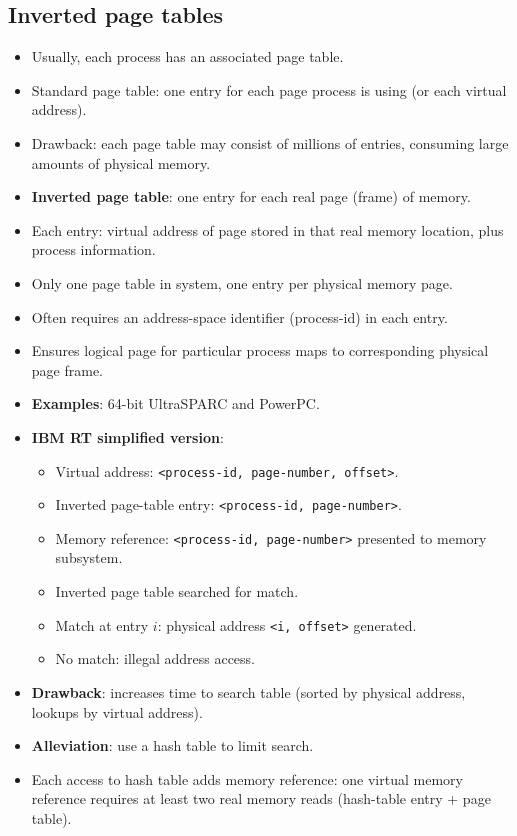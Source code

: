 \subsection{Inverted page tables}
\begin{itemize}
    \item Usually, each process has an associated page table.
    \item Standard page table: one entry for each page process is using (or each virtual address).
    \item Drawback: each page table may consist of millions of entries, consuming large amounts of physical memory.
    \item \textbf{Inverted page table}: one entry for each real page (frame) of memory.
    \item Each entry: virtual address of page stored in that real memory location, plus process information.
    \item Only one page table in system, one entry per physical memory page.
    \item Often requires an address-space identifier (process-id) in each entry.
    \item Ensures logical page for particular process maps to corresponding physical page frame.
    \item \textbf{Examples}: 64-bit UltraSPARC and PowerPC.
    \item \textbf{IBM RT simplified version}:
    \begin{itemize}
        \item Virtual address: \texttt{<process-id, page-number, offset>}.
        \item Inverted page-table entry: \texttt{<process-id, page-number>}.
        \item Memory reference: \texttt{<process-id, page-number>} presented to memory subsystem.
        \item Inverted page table searched for match.
        \item Match at entry $i$: physical address \texttt{<i, offset>} generated.
        \item No match: illegal address access.
    \end{itemize}
    \item \textbf{Drawback}: increases time to search table (sorted by physical address, lookups by virtual address).
    \item \textbf{Alleviation}: use a hash table to limit search.
    \item Each access to hash table adds memory reference: one virtual memory reference requires at least two real memory reads (hash-table entry + page table).

\end{itemize}
